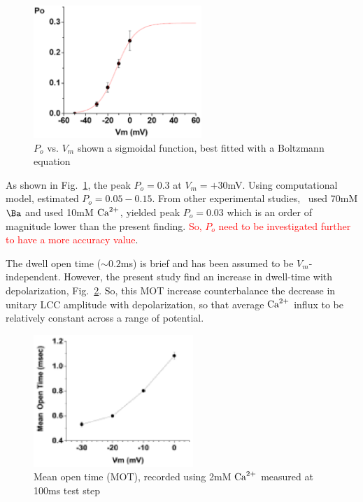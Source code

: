 \begin{figure}[hbt]
  \centerline{\includegraphics[height=5cm,
    angle=0]{./images/josephson_2010_Po.eps}}
\caption{$P_o$ vs. $V_m$ shown a sigmoidal function, best fitted with
  a Boltzmann equation}
\label{fig:josephson_2010_Po}
\end{figure}

As shown in Fig.~\ref{fig:josephson_2010_Po}, the peak $P_o=0.3$ at
$V_m=+30$mV. Using computational model, \citep{greenstein2002}
estimated $P_o=0.05-0.15$. From other experimental
studies,~\citep{herzig1993,handrock1998} used 70mM $\Ba$ and
\citep{rose1992} used 10mM ${\text{Ca}^{2+}}$, \citep{rose1992} yielded peak
$P_o=0.03$ which is an order of magnitude lower than the present
finding. \textcolor{red}{So, $P_o$ need to be investigated further to
  have a more accuracy value}. 

The dwell open time ($\sim 0.2$ms) is brief and has been assumed to be
$V_m$-independent. However, the present study find an increase in
dwell-time with depolarization, Fig.~\ref{fig:josephson_2010_tau}. So,
this MOT increase counterbalance the decrease in unitary LCC amplitude
with depolarization, so that average ${\text{Ca}^{2+}}$ influx to be relatively
constant across a range of potential. 

\begin{figure}[hbt]
  \centerline{\includegraphics[height=5cm,
    angle=0]{./images/josephson_2010_tau.eps}}
\caption{Mean open time (MOT), recorded using 2mM ${\text{Ca}^{2+}}$ measured at
  100ms test step}
\label{fig:josephson_2010_tau}
\end{figure}


